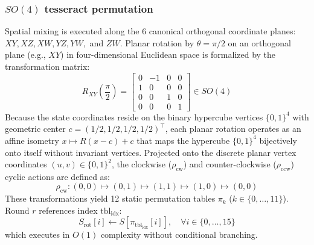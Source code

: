 \documentclass[review,12pt]{elsarticle}
\begin{document}
\subsubsection{\texorpdfstring{$SO(4)$}{SO(4)} tesseract permutation}
Spatial mixing is executed along the 6 canonical orthogonal coordinate planes: $XY, XZ, XW, YZ, YW,$ and $ZW$. Planar rotation by $\theta = \pi/2$ on an orthogonal plane (e.g., $XY$) in four-dimensional Euclidean space is formalized by the transformation matrix:
\begin{equation}
    R_{XY}\left(\frac{\pi}{2}\right) = \begin{bmatrix}
        0 & -1 & 0 & 0 \\
        1 & 0 & 0 & 0 \\
        0 & 0 & 1 & 0 \\
        0 & 0 & 0 & 1
    \end{bmatrix} \in SO(4)
\end{equation}
Because the state coordinates reside on the binary hypercube vertices $\{0, 1\}^4$ with geometric center $c = (1/2, 1/2, 1/2, 1/2)^\top$, each planar rotation operates as an affine isometry $x \mapsto R(x - c) + c$ that maps the hypercube $\{0, 1\}^4$ bijectively onto itself without invariant vertices. Projected onto the discrete planar vertex coordinates $(u, v) \in \{0, 1\}^2$, the clockwise ($\rho_{\text{cw}}$) and counter-clockwise ($\rho_{\text{ccw}}$) cyclic actions are defined as:
\begin{equation}
    \rho_{\text{cw}}: (0,0) \mapsto (0,1) \mapsto (1,1) \mapsto (1,0) \mapsto (0,0)
\end{equation}
These transformations yield 12 static permutation tables $\pi_k$ ($k \in \{0, \dots, 11\}$). Round $r$ references index $\text{tbl}_{\text{idx}}$:
\begin{equation}
    S_{\text{rot}}[i] \leftarrow S[\pi_{\text{tbl}_{\text{idx}}}[i]], \quad \forall i \in \{0, \dots, 15\}
\end{equation}
which executes in $O(1)$ complexity without conditional branching.
\end{document}
